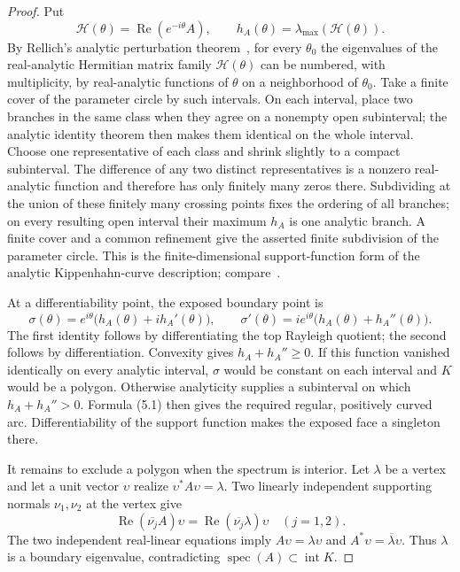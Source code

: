 \documentclass[preprints,article,submit,oneauthor]{Definitions/mdpi}
\numberwithin{equation}{section}
\newcommand{\spec}{\operatorname{spec}}
\newcommand{\Rea}{\operatorname{Re}}
\newcommand{\Int}{\operatorname{int}}
\begin{document}
\begin{proof}
Put
\[
 \mathcal H(\theta)=\Rea(e^{-i\theta}A),\qquad
 h_A(\theta)=\lambda_{\max}(\mathcal H(\theta)).
\]
By Rellich's analytic perturbation theorem~\cite{Rellich1937}, for every
\(\theta_0\) the eigenvalues of the real-analytic Hermitian matrix family
\(\mathcal H(\theta)\) can be numbered, with multiplicity, by real-analytic
functions of \(\theta\) on a neighborhood of \(\theta_0\).  Take
a finite cover of the parameter circle by such intervals.  On each interval,
place two branches in the same class when they agree on a nonempty open
subinterval; the analytic identity theorem then makes them identical on the
whole interval.  Choose one representative of each class and shrink slightly
to a compact subinterval.  The difference of any two distinct representatives
is a nonzero real-analytic function and therefore has only finitely many zeros
there.  Subdividing at the union of these finitely many crossing points fixes
the ordering of all branches; on every resulting open interval their maximum
\(h_A\) is one analytic branch.  A finite cover and a common refinement give
the asserted finite subdivision of the parameter circle.  This is the
finite-dimensional support-function form of the analytic Kippenhahn-curve
description; compare~\cite{PlaumannSinnWeis2021}.

At a differentiability point, the exposed boundary point is
\[
 \sigma(\theta)=e^{i\theta}\bigl(h_A(\theta)+ih_A'(\theta)\bigr),\qquad
 \sigma'(\theta)=ie^{i\theta}\bigl(h_A(\theta)+h_A''(\theta)\bigr). \tag{5.1}
\]
The first identity follows by differentiating the top Rayleigh quotient; the
second follows by differentiation.  Convexity gives
\(h_A+h_A''\geq0\).  If this function vanished identically on every analytic
interval, \(\sigma\) would be constant on each interval and \(K\) would be a
polygon.  Otherwise analyticity supplies a subinterval on which
\(h_A+h_A''>0\).  Formula (5.1) then gives the required regular, positively curved
arc.  Differentiability of the support function makes the exposed face a
singleton there.

It remains to exclude a polygon when the spectrum is interior.  Let
\(\lambda\) be a vertex and let a unit vector \(\upsilon\) realize
\(\upsilon^*A\upsilon=\lambda\).  Two linearly independent supporting normals
\(\nu_1,\nu_2\) at the vertex give
\[
 \Rea(\overline{\nu_j}A)\upsilon
 =\Rea(\overline{\nu_j}\lambda)\upsilon
 \quad(j=1,2).
\]
The two independent real-linear equations imply
\(A\upsilon=\lambda\upsilon\) and
\(A^*\upsilon=\overline\lambda\upsilon\).  Thus \(\lambda\) is a
boundary eigenvalue, contradicting \(\spec(A)\subset\Int K\).
\end{proof}
\end{document}
